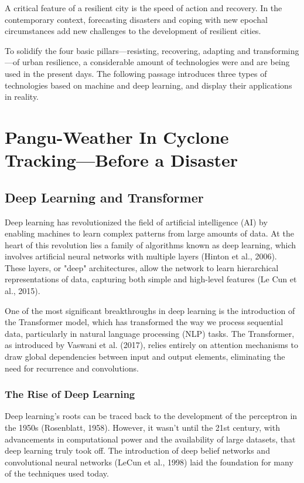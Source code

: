\documentclass[conference]{IEEEtran}
\begin{document}
A critical feature of a resilient city is the speed of action and recovery. In the contemporary context, forecasting disasters and coping with new epochal circumstances add new challenges to the development of resilient cities. 

To solidify the four basic pillars---resisting, recovering, adapting and transforming---of urban resilience\cite{b14}, a considerable amount of technologies were and are being used in the present days. The following passage introduces three types of technologies based on machine and deep learning, and display their applications in reality.

\section{\textbf{Pangu-Weather In Cyclone Tracking---Before a Disaster}}
\subsection{Deep Learning and Transformer}
Deep learning has revolutionized the field of artificial intelligence (AI) by enabling machines to learn complex patterns from large amounts of data. At the heart of this revolution lies a family of algorithms known as deep learning, which involves artificial neural networks with multiple layers (Hinton et al., 2006)\cite{b58}. These layers, or "deep" architectures, allow the network to learn hierarchical representations of data, capturing both simple and high-level features (Le Cun et al., 2015)\cite{b59}.

One of the most significant breakthroughs in deep learning is the introduction of the Transformer model, which has transformed the way we process sequential data, particularly in natural language processing (NLP) tasks. The Transformer, as introduced by Vaswani et al. (2017)\cite{b60}, relies entirely on attention mechanisms to draw global dependencies between input and output elements, eliminating the need for recurrence and convolutions.

\subsubsection{The Rise of Deep Learning}
Deep learning's roots can be traced back to the development of the perceptron in the 1950s (Rosenblatt, 1958)\cite{b61}. However, it wasn't until the 21st century, with advancements in computational power and the availability of large datasets, that deep learning truly took off. The introduction of deep belief networks and convolutional neural networks (LeCun et al., 1998)\cite{b62} laid the foundation for many of the techniques used today.
\end{document}
